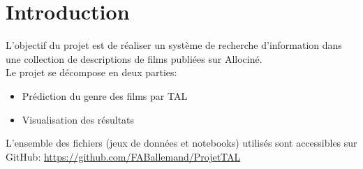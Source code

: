 \section*{Introduction}
L'objectif du projet est de réaliser un système de recherche d’information dans une collection de descriptions de films publiées sur Allociné.\\
Le projet se décompose en deux parties:
\begin{itemize}
\item  Prédiction du genre des films par TAL
\item Visualisation des résultats
\end{itemize}

L'ensemble des fichiers (jeux de données et notebooks) utilisés sont accessibles sur GitHub: \url{https://github.com/FABallemand/ProjetTAL}